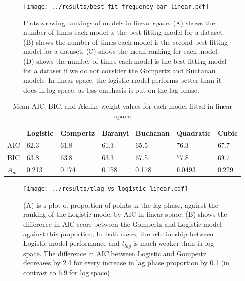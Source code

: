 \documentclass[11pt, a4paper]{article}
\begin{document}
        
         \begin{figure}[H]
        \texttt{[image: ../results/best\_fit\_frequency\_bar\_linear.pdf]}
        \centering
        \caption{Plots showing rankings of models in linear space. (A) shows the number of times each model is the best fitting model for a dataset. (B) shows the number of times each model is the second best fitting model for a dataset. (C) shows the mean ranking for each model. (D) shows the number of times each model is the best fitting model for a dataset if we do not consider the Gompertz and Buchanan models.  In linear space, the logistic model performs better than it does in log space, as less emphasis is put on the lag phase.}
        \label{sup:frequency_bar_linear}
        \end{figure} 
        
\begin{table}[H]
\centering
\begin{tabular}{l|llllll}
       & Logistic & Gompertz & Baranyi & Buchanan & Quadratic & Cubic \\ \hline
AIC & 62.3    & 61.8    & 61.3   & 65.5    & 76.3     & 67.7 \\
BIC & 63.8    & 63.8    & 63.3   & 67.5    & 77.8     & 69.7 \\
$A_w$ & 0.213     & 0.174    & 0.158   & 0.178     & 0.0493     &   0.229

\end{tabular}
\caption{Mean AIC, BIC, and Akaike weight values for each model fitted in linear space}
\label{suptable:meanAICBIClinear}
\end{table}




        
        \begin{figure}[H]
        \texttt{[image: ../results/tlag\_vs\_logistic\_linear.pdf]}
        \centering
        \caption{(A) is a plot of proportion of points in the lag phase, against the ranking of the Logistic model by AIC in linear space. (B) shows the difference in AIC score between the Gompertz and Logistic model against this proportion, In both cases, the relationship between Logistic model performance and $t_{lag}$ is much weaker than in log space. The difference in AIC between Logistic and Gompertz decreases by 2.4 for every increase in lag phase proportion by 0.1 (in contrast to 6.9 for log space)}
        \label{sup:tlag_logistic_linear}
        \end{figure} 
        
\end{document}

